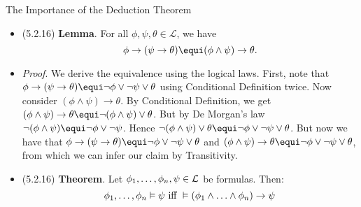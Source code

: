 \begin{frame}{The Importance of the Deduction Theorem}

	\begin{itemize}
%	
		\item (5.2.16) \textbf{Lemma}. For all $\phi,\psi,\theta\in\mathcal{L}$, we have \[\phi\to(\psi\to\theta)\equi (\phi\land\psi)\to\theta.\]
		\item \emph{Proof}. We derive the equivalence using the logical laws. First, note that $\phi\to(\psi\to\theta)\equi \neg\phi\lor \neg \psi\lor \theta$ using Conditional Definition twice. Now consider $(\phi\land\psi)\to\theta$. By Conditional Definition, we get $(\phi\land\psi)\to\theta\equi \neg(\phi\land\psi)\lor\theta$. But by De Morgan's law $\neg(\phi\land\psi)\equi \neg\phi\lor\neg\psi$. Hence $\neg(\phi\land\psi)\lor\theta\equi  \neg\phi\lor\neg\psi\lor\theta$. But now we have that $\phi\to(\psi\to\theta)\equi \neg\phi\lor \neg \psi\lor \theta$ and $(\phi\land\psi)\to\theta\equi  \neg\phi\lor\neg\psi\lor\theta$, from which we can infer our claim by Transitivity. 

%	

	\item (5.2.16) \textbf{Theorem}. Let $\phi_1,\mathellipsis, \phi_n,\psi\in\mathcal{L}$ be formulas. Then:
	\[\phi_1,\mathellipsis, \phi_n\vDash \psi\text{ iff }\vDash (\phi_1\land\mathellipsis\land\phi_n)\to\psi\]

	\end{itemize}

\end{frame}

